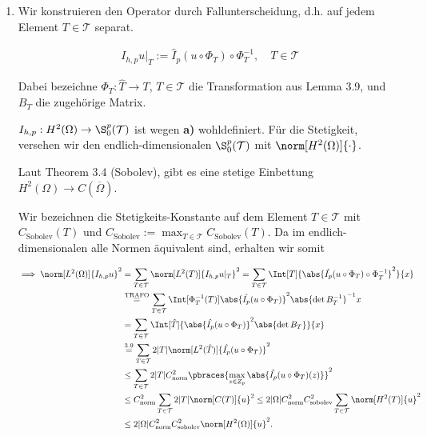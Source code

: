 \begin{solution}
\begin{enumerate}[label = \textbf{\alph*)}]
\begin{enumerate}[label = (\roman*)]
    \end{enumerate}
  
    \item Wir konstruieren den Operator durch Fallunterscheidung, d.h. auf jedem Element $T \in \mathcal{T}$ separat.
  
    \begin{align*}
      I_{h, p} u|_T := \hat I_p(u \circ \Phi_T) \circ \Phi_T^{-1},
      \quad
      T \in \mathcal{T}
    \end{align*}
  
    Dabei bezeichne $\Phi_T: \hat T \to T$, $T \in \mathcal{T}$ die Transformation aus Lemma 3.9, und $B_T$ die zugehörige Matrix.
  
  
    $I_{h, p}: H^2(\Omega) \to \S_0^p(\mathcal{T})$ ist wegen \textbf{a)} wohldefiniert.
    Für die Stetigkeit, versehen wir den endlich-dimensionalen $\S_0^p(\mathcal{T})$ mit $\norm[H^2(\Omega)]{\cdot}$.
  
    Laut Theorem 3.4 (Sobolev), gibt es eine stetige Einbettung $H^2(\Omega) \to C(\overline{\Omega})$.
  
  
    Wir bezeichnen die Stetigkeits-Konstante auf dem Element $T \in \mathcal{T}$ mit $C_\mathrm{Sobolev}(T)$ und $C_\mathrm{Sobolev} := \max_{T \in \mathcal{T}} C_\mathrm{Sobolev}(T)$.
    Da im endlich-dimensionalen alle Normen äquivalent sind, erhalten wir somit
  
    \begin{align*}
      \implies
      \norm[L^2(\Omega)]{I_{h, p} u}^2
      & =
      \sum_{T \in \mathcal{T}}
      \norm[L^2(T)]{I_{h, p} u|_T}^2
      =
      \sum_{T \in \mathcal{T}}
      \Int[T]{\abs{\hat{I_p}(u \circ \Phi_T) \circ \Phi_T^{-1}}^2}{x} \\
      & \stackrel
      {
        \mathrm{TRAFO}
      }{=}
      \sum_{T \in \mathcal{T}}
      \Int[\Phi_T^{-1}(T)]{\abs{\hat{I_p}(u \circ \Phi_T)}^2 \abs{\det B_T^{-1}}^{-1}}{x} \\
      & =
      \sum_{T \in \mathcal{T}}
      \Int[\hat T]{\abs{\hat{I_p}(u \circ \Phi_T)}^2 \abs{\det B_T}}{x} \\
      & \stackrel
      {
        \mathrm{3.9}
      }{=}
      \sum_{T \in \mathcal{T}}
      2 |T| \norm[L^2(\hat T)]{\hat{I_p}(u \circ \Phi_T)}^2 \\
      & \leq
      \sum_{T \in \mathcal{T}}
      2 |T| C_\mathrm{norm}^2
      \pbraces
      {
        \max_{z \in Z_p}
        \abs{\hat{I_p}(u \circ \Phi_T)(z)}
      }^2 \\
      & \leq
      C_\mathrm{norm}^2
      \sum_{T \in \mathcal{T}}
      2 |T| \norm[C(T)]{u}^2
      \leq
      2 |\Omega| C_\mathrm{norm}^2 C_\mathrm{sobolev}^2
      \sum_{T \in \mathcal{T}}
      \norm[H^2(T)]{u}^2 \\
      & \leq
      2 |\Omega| C_\mathrm{norm}^2 C_\mathrm{sobolev}^2 \norm[H^2(\Omega)]{u}^2.
    \end{align*}
  

\end{enumerate}
\end{solution}
